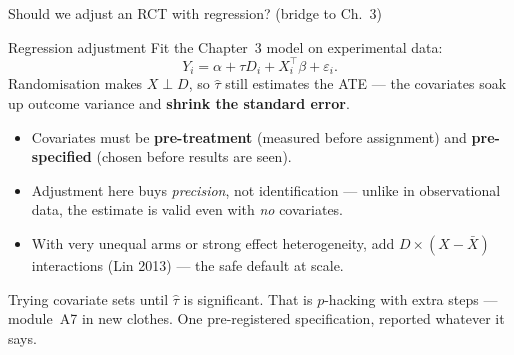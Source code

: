 \documentclass[aspectratio=169,11pt]{beamer}
\begin{document}
\begin{frame}{Should we adjust an RCT with regression? (bridge to Ch.\ 3)}
  \fontsize{7}{8.4}\selectfont
  \begin{block}{Regression adjustment}
    Fit the Chapter~3 model on experimental data:
    \[
      Y_i = \alpha + \tau D_i + X_i^\top\beta + \varepsilon_i .
    \]
    Randomisation makes $X \perp D$, so $\hat\tau$ still estimates the ATE --- the
    covariates soak up outcome variance and \textbf{shrink the standard error}.
  \end{block}
  \begin{readme}
    \begin{itemize}
      \item Covariates must be \textbf{pre-treatment} (measured before assignment) and
            \textbf{pre-specified} (chosen before results are seen).
      \item Adjustment here buys \emph{precision}, not identification --- unlike in
            observational data, the estimate is valid even with \emph{no} covariates.
      \item With very unequal arms or strong effect heterogeneity, add
            $D\times(X-\bar X)$ interactions (Lin 2013) --- the safe default at scale.
    \end{itemize}
  \end{readme}
  \begin{mistake}
    \fontsize{7}{8.4}\selectfont
    Trying covariate sets until $\hat\tau$ is significant. That is $p$-hacking with extra
    steps --- module~A7 in new clothes. One pre-registered specification, reported
    whatever it says.
  \end{mistake}
\end{frame}
\end{document}
